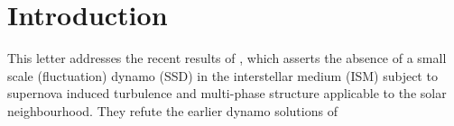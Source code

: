 \documentclass[preprint2]{aastex63}
\newcommand\aastex{AAS\TeX}
\newcommand\latex{La\TeX}
\begin{document}

\section{Introduction} \label{sec:intro}




This letter addresses the recent results of \citet{GE20}, which asserts the 
absence of a small scale (fluctuation) dynamo (SSD) in the interstellar medium
(ISM) subject to supernova induced turbulence and multi-phase structure
applicable to the solar neighbourhood. 
They refute the earlier dynamo solutions of \citet{BKMM04}

%
%
%
\end{document}
